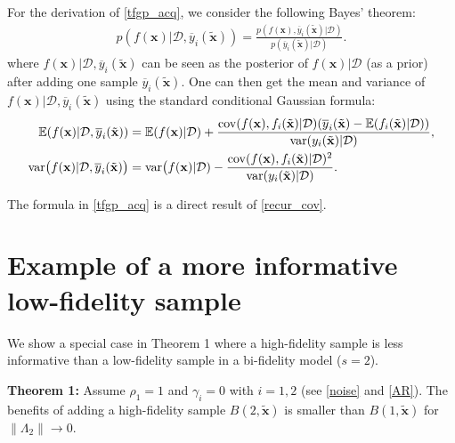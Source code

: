 \documentclass[11pt]{article}
\begin{document}
For the derivation of \eqref{tfgp_acq}, we consider the following Bayes' theorem:
\begin{align}
    p(f(\mathbf{x})|\mathcal{D}, \overline{y}_i(\tilde{\mathbf{x}})) = 
    \frac{p(f(\mathbf{x}), \overline{y}_i(\tilde{\mathbf{x}})|\mathcal{D})}{p( \overline{y}_i(\tilde{\mathbf{x}})|\mathcal{D})}.
\end{align}
where $f(\mathbf{x})|\mathcal{D}, \overline{y}_i(\tilde{\mathbf{x}})$ can be seen as the posterior of $f(\mathbf{x})|\mathcal{D}$ (as a prior) after adding one sample $\overline{y}_i(\tilde{\mathbf{x}})$. One can then get the mean and variance of $f(\mathbf{x})|\mathcal{D}, \overline{y}_i(\tilde{\mathbf{x}})$ using the standard conditional Gaussian formula:
\begin{align}
    \mathbb{E}(f(\mathbf{x})|\mathcal{D}, \overline{y}_i(\tilde{\mathbf{x}}))  & = \mathbb{E}(f(\mathbf{x})|\mathcal{D}) +  \frac{{\rm{cov}}(f(\mathbf{x}), f_i(\tilde{\mathbf{x}})| \mathcal{D})(\overline{y}_i(\tilde{\mathbf{x}})-\mathbb{E}(f_i(\tilde{\mathbf{x}})|\mathcal{D}))}{{\rm{var}}(y_i(\tilde{\mathbf{x}})|\mathcal{D})},
\\
    {\rm{var}}\big(f(\mathbf{x})|\mathcal{D}, \overline{y}_i(\tilde{\mathbf{x}})\big) 
    & = {\rm{var}}\big(f(\mathbf{x})|\mathcal{D}) -
    \frac{{\rm{cov}}(f(\mathbf{x}),
    f_i(\tilde{\mathbf{x}})| \mathcal{D})^2}
    {{\rm{var}}(y_i(\tilde{\mathbf{x}})|\mathcal{D})}.
\label{recur_cov}
\end{align}

The formula in \eqref{tfgp_acq} is a direct result of \eqref{recur_cov}.

\section{Example of a more informative low-fidelity sample}
We show a special case in Theorem 1 where a high-fidelity sample is less informative than a low-fidelity sample in a bi-fidelity model ($s=2$). 

\textbf{Theorem 1:} Assume $\rho_1=1$ and $\gamma_i=0$ with $i=1,2$ (see \eqref{noise} and \eqref{AR}). The benefits of adding a high-fidelity sample $B(2, \tilde{\mathbf{x}})$ is smaller than  $B(1, \tilde{\mathbf{x}})$ for $\|\Lambda_2\| \rightarrow 0$.
\end{document}
